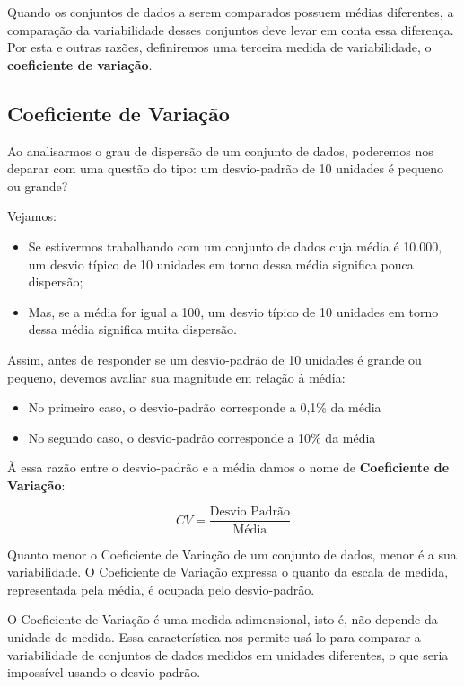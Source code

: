 \documentclass[
]{book}
\providecommand{\tightlist}{%
  \setlength{\itemsep}{0pt}\setlength{\parskip}{0pt}}
\begin{document}
Quando os conjuntos de dados a serem comparados possuem médias diferentes, a comparação da variabilidade desses conjuntos deve levar em conta essa diferença. Por esta e outras razões, definiremos uma terceira medida de variabilidade, o \textbf{coeficiente de variação}.

\hypertarget{coeficiente-de-variauxe7uxe3o}{%
\subsection{Coeficiente de Variação}\label{coeficiente-de-variauxe7uxe3o}}

Ao analisarmos o grau de dispersão de um conjunto de dados, poderemos nos deparar com uma questão do tipo: um desvio-padrão de 10 unidades é pequeno ou grande?

Vejamos:

\begin{itemize}
\tightlist
\item
  Se estivermos trabalhando com um conjunto de dados cuja média é 10.000, um desvio típico de 10 unidades em torno dessa média significa pouca dispersão;
\item
  Mas, se a média for igual a 100, um desvio típico de 10 unidades em torno dessa média significa muita dispersão.
\end{itemize}

Assim, antes de responder se um desvio-padrão de 10 unidades é grande ou pequeno, devemos avaliar sua magnitude em relação à média:

\begin{itemize}
\tightlist
\item
  No primeiro caso, o desvio-padrão corresponde a 0,1\% da média
\item
  No segundo caso, o desvio-padrão corresponde a 10\% da média
\end{itemize}

À essa razão entre o desvio-padrão e a média damos o nome de \textbf{Coeficiente de Variação}:

\begin{equation*}
CV=\frac{\text{Desvio Padrão}}{\text{Média}}
\end{equation*}

Quanto menor o Coeficiente de Variação de um conjunto de dados, menor é a sua variabilidade. O Coeficiente de Variação expressa o quanto da escala de medida, representada pela média, é ocupada pelo desvio-padrão.

O Coeficiente de Variação é uma medida adimensional, isto é, não depende da unidade de medida. Essa característica nos permite usá-lo para comparar a variabilidade de conjuntos de dados medidos em unidades diferentes, o que seria impossível usando o desvio-padrão.
\end{document}
